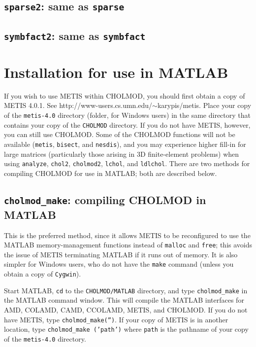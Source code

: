 \documentclass[11pt]{article}
\begin{document}
\subsection{{\tt sparse2}: same as {\tt sparse}}				
\newpage
\subsection{{\tt symbfact2}: same as {\tt symbfact}}				

\newpage \section{Installation for use in MATLAB}

If you wish to use METIS within CHOLMOD, you should first obtain a copy of METIS 4.0.1.
See http://www-users.cs.umn.edu/$\sim$karypis/metis.  Place your copy
of the {\tt metis-4.0} directory (folder, for Windows users) in the same directory
that contains your copy of the {\tt CHOLMOD} directory. If you do not have
METIS, however, you can still use CHOLMOD.  Some of the CHOLMOD functions will not
be available ({\tt metis}, {\tt bisect}, and {\tt nesdis}),
and you may experience higher fill-in for large matrices
(particularly those arising in 3D finite-element problems) when using
{\tt analyze}, {\tt chol2}, {\tt cholmod2}, {\tt lchol}, and {\tt ldlchol}.
There are two methods for compiling CHOLMOD for use in MATLAB; both
are described below.

\subsection{{\tt cholmod\_make}: compiling CHOLMOD in MATLAB}

This is the preferred method, since it allows METIS to be reconfigured to
use the MATLAB memory-management functions instead of {\tt malloc} and {\tt free};
this avoids the issue of METIS terminating MATLAB if it runs out of memory.
It is also simpler for Windows users, who do not have the {\tt make}
command (unless you obtain a copy of {\tt Cygwin}).

Start MATLAB, {\tt cd} to the {\tt CHOLMOD/MATLAB} directory, and
type {\tt cholmod\_make} in the MATLAB command window.  This will compile
the MATLAB interfaces for AMD, COLAMD, CAMD, CCOLAMD, METIS, and CHOLMOD.
If you do not have METIS, type {\tt cholmod\_make('')}.
If your copy of METIS is in another location, type
{\tt cholmod\_make ('path')} where {\tt path} is the pathname
of your copy of the {\tt metis-4.0} directory.
\end{document}
